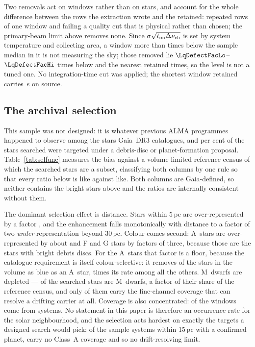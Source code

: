 Two removals act on windows rather than on stars, and account for the whole
difference between the
\LqNExport{} rows the extraction wrote and the \NWindows{} retained:
\NDup{} repeated rows of one window and
\NDefect{} failing a quality cut that is physical rather than chosen; the
primary-beam limit above removes none.
Since $\sigma\sqrt{t_{\rm on}\Delta\nu_{\rm ch}}$ is set by system
temperature and collecting area, a window more than \LqDefectCut{} times
below the sample median in it is not measuring the sky; those removed lie
$\LqDefectFacLo$--$\LqDefectFacHi$ times below and the nearest retained
\LqKeptFac{} times, so the level is not a tuned one. No integration-time cut
was applied; the shortest window retained carries \LqOnsrcMin\,s on source.

\subsection{The archival selection}
\label{sec:bias}

This sample was not designed: it is whatever previous ALMA programmes
happened to observe among the stars Gaia~DR3 catalogues, and
\PctDiscProposal{} per cent of the stars searched were targeted under a
debris-disc or planet-formation proposal. Table~\ref{tab:selfunc} measures
the bias against a volume-limited reference census of which the searched
stars are a subset, classifying both columns by one rule so that every ratio
below is like against like. Both columns are Gaia-defined, so neither
contains the bright stars above and the ratios are internally consistent
without them.

The dominant selection effect is distance. Stars within 5\,pc are
over-represented by a factor \SfTopRatio, and the enhancement falls
monotonically with distance to a factor of two \emph{under}-representation
beyond 30\,pc. Colour comes second: A~stars are over-represented by about
\SfARatio{} and F and G stars by factors of three, because those are the
stars with bright debris discs. For the A~stars that factor is a floor,
because the catalogue requirement is itself colour-selective: it removes
\BsNEarly{} of the \BsNEarlyVol{} stars in the volume as blue as an A~star,
\BsEarlyRatio{} times its rate among all the others. M~dwarfs are depleted
---
\SfMSearched{} of the \SfNStar{} searched stars are M~dwarfs, a factor
\SfMRatio{} of their share of the reference census, and only
\SfMClassAStars{} of them carry the fine-channel coverage that can resolve a
drifting carrier at all. Coverage is also concentrated:
\ConcThreeWin{} of the \NWindows{} windows come from \ConcThreeSys{}
systems. No statement in this paper is therefore an occurrence rate for the
solar neighbourhood, and the selection acts hardest on
exactly the targets a designed search would pick: of the \CsIntNRow{} sample
systems within 15\,pc with a confirmed planet, \CsIntNoClassA{} carry no
Class~A coverage and so no drift-resolving limit.

